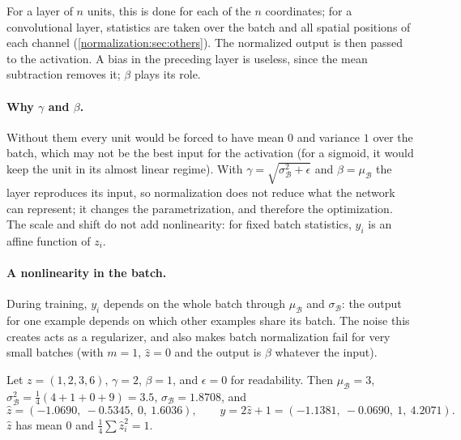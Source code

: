 \begin{notechapter}
For a layer of $n$ units, this is done for each of the $n$ coordinates; for a convolutional
layer, statistics are taken over the batch and all spatial positions of each channel
(\cref{normalization:sec:others}). The normalized output is then passed to the activation.
A bias in the preceding layer is useless, since the mean subtraction removes it; $\beta$ plays its
role.

\paragraph{Why $\gamma$ and $\beta$.} Without them every unit would be forced to have mean $0$ and variance $1$
over the batch, which may not be the best input for the activation (for a sigmoid, it
would keep the unit in its almost linear regime). With $\gamma = \sqrt{\sigma_{\mathcal B}^2 + \epsilon}$ and $\beta = \mu_{\mathcal B}$ the layer
reproduces its input, so normalization does not reduce what the network can represent;
it changes the parametrization, and therefore the optimization. The scale and shift do not
add nonlinearity: for fixed batch statistics, $y_i$ is an affine function of $z_i$.

\paragraph{A nonlinearity in the batch.} During training, $y_i$ depends on the whole batch
through $\mu_{\mathcal B}$ and $\sigma_{\mathcal B}$: the output for one example depends on which other examples share its
batch. The noise this creates acts as a regularizer, and also makes batch normalization
fail for very small batches (with $m = 1$, $\hat z = 0$ and the output is $\beta$ whatever the input).

\begin{example}\label{normalization:ex:bn}
Let $z = (1,2,3,6)$, $\gamma = 2$, $\beta = 1$, and $\epsilon = 0$ for readability. Then $\mu_{\mathcal B} = 3$,
$\sigma_{\mathcal B}^2 = \frac14(4 + 1 + 0 + 9) = 3.5$, $\sigma_{\mathcal B} = 1.8708$, and
\[
  \hat z = (-1.0690,\ -0.5345,\ 0,\ 1.6036),\qquad y = 2\hat z + 1 = (-1.1381,\ -0.0690,\ 1,\ 4.2071) .
\]
$\hat z$ has mean $0$ and $\frac14\sum\hat z_i^2 = 1$.
\end{example}


\end{notechapter}
